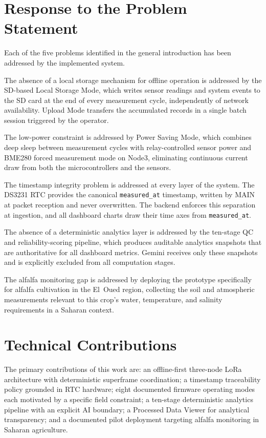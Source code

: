 \section*{Response to the Problem Statement}

Each of the five problems identified in the general introduction has been addressed
by the implemented system.

The absence of a local storage mechanism for offline operation is addressed by
the SD-based Local Storage Mode, which writes sensor readings and system events
to the SD card at the end of every measurement cycle, independently of network
availability. Upload Mode transfers the accumulated records in a single batch
session triggered by the operator.

The low-power constraint is addressed by Power Saving Mode, which combines deep
sleep between measurement cycles with relay-controlled sensor power and BME280
forced measurement mode on Node3, eliminating continuous current draw from both
the microcontrollers and the sensors.

The timestamp integrity problem is addressed at every layer of the system. The
DS3231 RTC provides the canonical \texttt{measured\_at} timestamp, written by
MAIN at packet reception and never overwritten. The backend enforces this
separation at ingestion, and all dashboard charts draw their time axes from
\texttt{measured\_at}.

The absence of a deterministic analytics layer is addressed by the ten-stage
QC and reliability-scoring pipeline, which produces auditable analytics snapshots
that are authoritative for all dashboard metrics. Gemini receives only these
snapshots and is explicitly excluded from all computation stages.

The alfalfa monitoring gap is addressed by deploying the prototype specifically
for alfalfa cultivation in the El~Oued region, collecting the soil and atmospheric
measurements relevant to this crop's water, temperature, and salinity requirements
in a Saharan context.

\section*{Technical Contributions}

The primary contributions of this work are: an offline-first three-node LoRa
architecture with deterministic superframe coordination; a timestamp traceability
policy grounded in RTC hardware; eight documented firmware operating modes each
motivated by a specific field constraint; a ten-stage deterministic analytics
pipeline with an explicit AI boundary; a Processed Data Viewer for analytical
transparency; and a documented pilot deployment targeting alfalfa monitoring in
Saharan agriculture.

